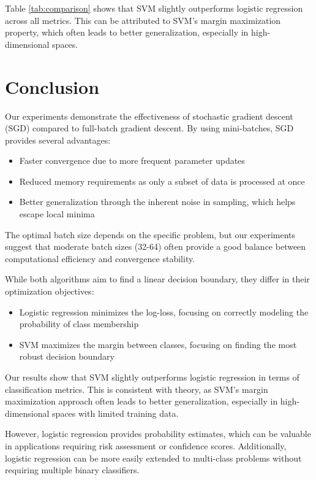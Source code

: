 \documentclass[journal, a4paper]{IEEEtran}
\begin{document}
Table \ref{tab:comparison} shows that SVM slightly outperforms logistic regression across all metrics. This can be attributed to SVM's margin maximization property, which often leads to better generalization, especially in high-dimensional spaces.

\section{Conclusion}
Our experiments demonstrate the effectiveness of stochastic gradient descent (SGD) compared to full-batch gradient descent. By using mini-batches, SGD provides several advantages:

\begin{itemize}
    \item Faster convergence due to more frequent parameter updates
    \item Reduced memory requirements as only a subset of data is processed at once
    \item Better generalization through the inherent noise in sampling, which helps escape local minima
\end{itemize}

The optimal batch size depends on the specific problem, but our experiments suggest that moderate batch sizes (32-64) often provide a good balance between computational efficiency and convergence stability.

While both algorithms aim to find a linear decision boundary, they differ in their optimization objectives:

\begin{itemize}
    \item Logistic regression minimizes the log-loss, focusing on correctly modeling the probability of class membership
    \item SVM maximizes the margin between classes, focusing on finding the most robust decision boundary
\end{itemize}

Our results show that SVM slightly outperforms logistic regression in terms of classification metrics. This is consistent with theory, as SVM's margin maximization approach often leads to better generalization, especially in high-dimensional spaces with limited training data.

However, logistic regression provides probability estimates, which can be valuable in applications requiring risk assessment or confidence scores. Additionally, logistic regression can be more easily extended to multi-class problems without requiring multiple binary classifiers.
\end{document}
